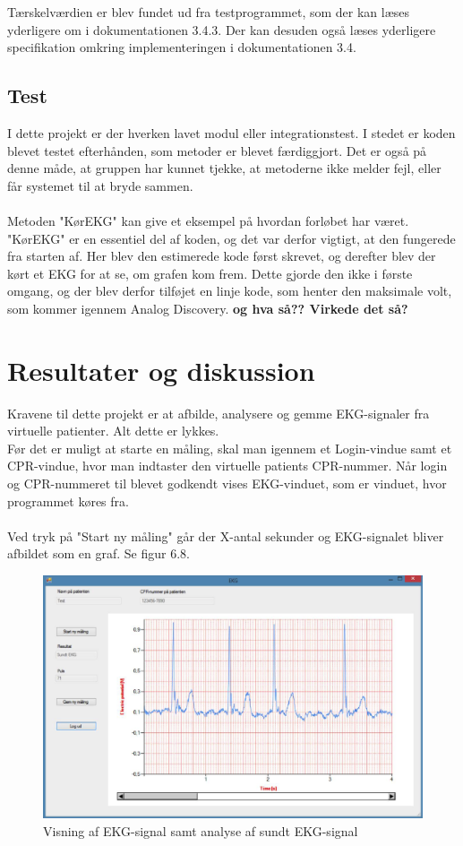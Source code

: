Tærskelværdien er blev fundet ud fra testprogrammet, som der kan læses yderligere om i dokumentationen 3.4.3. Der kan desuden også læses yderligere specifikation omkring implementeringen i dokumentationen 3.4. 


\subsection{Test}
I dette projekt er der hverken lavet modul eller integrationstest. I stedet er koden blevet testet efterhånden, som metoder er blevet færdiggjort. Det er også på denne måde, at gruppen har kunnet tjekke, at metoderne ikke melder fejl, eller får systemet til at bryde sammen. \\ \\
Metoden "KørEKG" kan give et eksempel på hvordan forløbet har været. "KørEKG" er en essentiel del af koden, og det var derfor vigtigt, at den fungerede fra starten af. Her blev den estimerede kode først skrevet, og derefter blev der kørt et EKG for at se, om grafen kom frem. Dette gjorde den ikke i første omgang, og der blev derfor tilføjet en linje kode, som henter den maksimale volt, som kommer igennem Analog Discovery. \textbf{og hva så?? Virkede det så?}

\section{Resultater og diskussion}
Kravene til dette projekt er at afbilde, analysere og gemme EKG-signaler fra virtuelle patienter. Alt dette er lykkes. \\ 
Før det er muligt at starte en måling, skal man igennem et Login-vindue samt et CPR-vindue, hvor man indtaster den virtuelle patients CPR-nummer. Når login og CPR-nummeret til blevet godkendt vises EKG-vinduet, som er vinduet, hvor programmet køres fra. \\ \\
Ved tryk på "Start ny måling" går der X-antal sekunder og EKG-signalet bliver afbildet som en graf. Se figur 6.8. 

\begin{figure}[H]
	\centering
	\includegraphics[width=1\textwidth]{Figurer/Snip20150525_25}
	\caption{Visning af EKG-signal samt analyse af sundt EKG-signal}
\end{figure}

